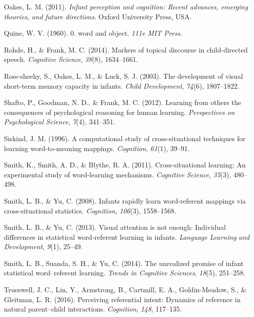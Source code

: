 \documentclass[authoryear, review]{elsarticle}
\begin{document}
\hypertarget{ref-oakes2011infant}{}
Oakes, L. M. (2011). \emph{Infant perception and cognition: Recent
advances, emerging theories, and future directions}. Oxford University
Press, USA.

\hypertarget{ref-quine19600}{}
Quine, W. V. (1960). 0. word and object. \emph{111e MIT Press}.

\hypertarget{ref-rohde2014markers}{}
Rohde, H., \& Frank, M. C. (2014). Markers of topical discourse in
child-directed speech. \emph{Cognitive Science}, \emph{38}(8),
1634--1661.

\hypertarget{ref-ross2003development}{}
Ross-sheehy, S., Oakes, L. M., \& Luck, S. J. (2003). The development of
visual short-term memory capacity in infants. \emph{Child Development},
\emph{74}(6), 1807--1822.

\hypertarget{ref-shafto2012learning}{}
Shafto, P., Goodman, N. D., \& Frank, M. C. (2012). Learning from others
the consequences of psychological reasoning for human learning.
\emph{Perspectives on Psychological Science}, \emph{7}(4), 341--351.

\hypertarget{ref-siskind1996computational}{}
Siskind, J. M. (1996). A computational study of cross-situational
techniques for learning word-to-meaning mappings. \emph{Cognition},
\emph{61}(1), 39--91.

\hypertarget{ref-smith2011cross}{}
Smith, K., Smith, A. D., \& Blythe, R. A. (2011). Cross-situational
learning: An experimental study of word-learning mechanisms.
\emph{Cognitive Science}, \emph{35}(3), 480--498.

\hypertarget{ref-smith2008infants}{}
Smith, L. B., \& Yu, C. (2008). Infants rapidly learn word-referent
mappings via cross-situational statistics. \emph{Cognition},
\emph{106}(3), 1558--1568.

\hypertarget{ref-smith2013visual}{}
Smith, L. B., \& Yu, C. (2013). Visual attention is not enough:
Individual differences in statistical word-referent learning in infants.
\emph{Language Learning and Development}, \emph{9}(1), 25--49.

\hypertarget{ref-smith2014unrealized}{}
Smith, L. B., Suanda, S. H., \& Yu, C. (2014). The unrealized promise of
infant statistical word--referent learning. \emph{Trends in Cognitive
Sciences}, \emph{18}(5), 251--258.

\hypertarget{ref-trueswell2016perceiving}{}
Trueswell, J. C., Lin, Y., Armstrong, B., Cartmill, E. A.,
Goldin-Meadow, S., \& Gleitman, L. R. (2016). Perceiving referential
intent: Dynamics of reference in natural parent--child interactions.
\emph{Cognition}, \emph{148}, 117--135.
\end{document}
